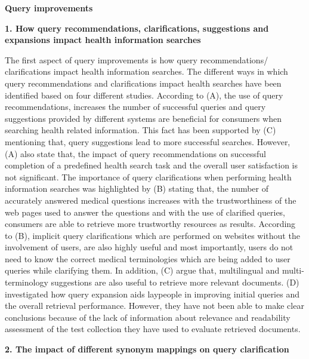 \documentclass[]{article}
\begin{document}
\textbf{Query improvements}


\textbf{1. How query recommendations, clarifications, suggestions and expansions impact health information searches}


The first aspect of query improvements is how query recommendations/ clarifications impact health information searches. The different ways in which query recommendations and clarifications impact health searches have been identified based on four different studies. According to (A), the use of query recommendations, increases the number of successful queries and query suggestions provided by different systems are beneficial for consumers when searching health related information. This fact has been supported by (C) mentioning that, query suggestions lead to more successful searches.  However, (A) also state that, the impact of query recommendations on successful completion of a predefined health search task and the overall user satisfaction is not significant. The importance of query clarifications when performing health information searches was highlighted by (B) stating that, the number of accurately answered medical questions increases with the trustworthiness of the web pages used to answer the questions and with the use of clarified queries, consumers are able to retrieve more trustworthy resources as results. According to (B), implicit query clarifications which are performed on websites without the involvement of users, are also highly useful and most importantly, users do not need to know the correct medical terminologies which are being added to user queries while clarifying them. In addition, (C) argue that, multilingual and multi-terminology suggestions are also useful to retrieve more relevant documents. (D) investigated how query expansion aids laypeople in improving initial queries and the overall retrieval performance. However, they have not been able to make clear conclusions because of the lack of information about relevance and readability assessment of the test collection they have used to evaluate retrieved documents. 

\textbf{2. The impact of different synonym mappings on query clarification}
\end{document}
